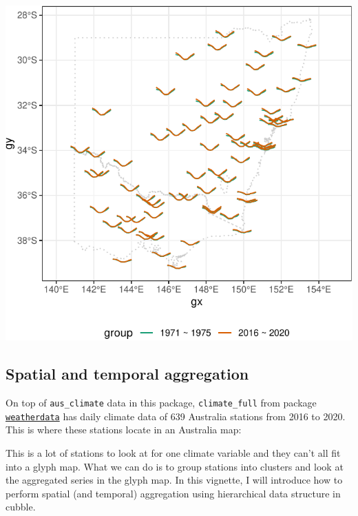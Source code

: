 \documentclass[
]{jss}
\begin{document}
\begin{CodeChunk}


\begin{center}\includegraphics{figures/unnamed-chunk-10-1} \end{center}

\end{CodeChunk}

\hypertarget{spatial-and-temporal-aggregation}{%
\subsection{Spatial and temporal
aggregation}\label{spatial-and-temporal-aggregation}}

On top of \texttt{aus\_climate} data in this package,
\texttt{climate\_full} from package
\href{https://github.com/huizezhang-sherry/weatherdata}{\texttt{weatherdata}}
has daily climate data of 639 Australia stations from 2016 to 2020. This
is where these stations locate in an Australia map:

This is a lot of stations to look at for one climate variable and they
can't all fit into a glyph map. What we can do is to group stations into
clusters and look at the aggregated series in the glyph map. In this
vignette, I will introduce how to perform spatial (and temporal)
aggregation using hierarchical data structure in cubble.
\end{document}
